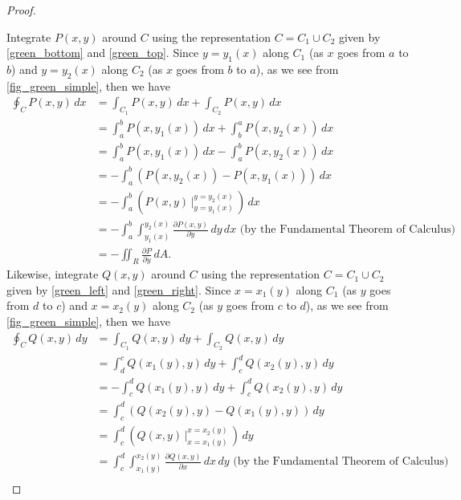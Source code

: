 \begin{proof}
\begin{lxfigure}
\begin{center}
 \label{fig_green_simple}
 \end{center}
 \end{lxfigure}
 Integrate $P(x,y)$ around $C$ using the representation $C = C_1 \cup C_2$ given by \eqref{green_bottom} and \eqref{green_top}. Since $y = y_1(x)$ along $C_1$ (as $x$ goes from $a$ to $b$) and $y = y_2(x)$ along $C_2$ (as $x$ goes from $b$ to $a$), as we see from \autoref{fig_green_simple}, then we have
 \begin{align*}
  \oint_C P(x,y)\,dx &= \int_{C_1} P(x,y)\,dx + \int_{C_2} P(x,y)\,dx\\
   &= \int_a^b P(x,y_1(x))\,dx + \int_b^a P(x,y_2(x))\,dx\\
   &= \int_a^b P(x,y_1(x))\,dx - \int_a^b P(x,y_2(x))\,dx\\[6pt]
   &= -\int_a^b \left( P(x,y_2(x)) - P(x,y_1(x)) \right)\,dx\\[6pt]
   &= -\int_a^b \left( P(x,y) \,\Big|_{y = y_1(x)}^{y = y_2(x)} \,\right)\,dx\\[6pt]
   &= -\int_a^b \int_{y_1(x)}^{y_2(x)} \frac{\partial P(x,y)}{\partial y}\,dy\,dx \text{ (by the Fundamental Theorem of Calculus)}\\[6pt]
   &= -\iint_{R} \frac{\partial P}{\partial y}\,dA .
 \end{align*}
 Likewise, integrate $Q(x,y)$ around $C$ using the representation $C = C_1 \cup C_2$ given by \eqref{green_left} and \eqref{green_right}. Since $x = x_1(y)$ along $C_1$ (as $y$ goes from $d$ to $c$) and $x = x_2(y)$ along $C_2$ (as $y$ goes from $c$ to $d$), as we see from \autoref{fig_green_simple}, then we have
 \begin{align*}
  \oint_C Q(x,y)\,dy &= \int_{C_1} Q(x,y)\,dy + \int_{C_2} Q(x,y)\,dy\\
   &= \int_d^c Q(x_1(y),y)\,dy + \int_c^d Q(x_2(y),y)\,dy\\
   &= -\int_c^d Q(x_1(y),y)\,dy + \int_c^d Q(x_2(y),y)\,dy\\[6pt]
   &= \int_c^d \left( Q(x_2(y),y) - Q(x_1(y),y) \right)\,dy\\[6pt]
   &= \int_c^d \left( Q(x,y) \,\Big|_{x = x_1(y)}^{x = x_2(y)} \,\right)\,dy\\[6pt]
   &= \int_c^d \int_{x_1(y)}^{x_2(y)} \frac{\partial Q(x,y)}{\partial x}\,dx\,dy \text{ (by the Fundamental Theorem of Calculus)}\\[6pt]

\end{align*}
\end{proof}
